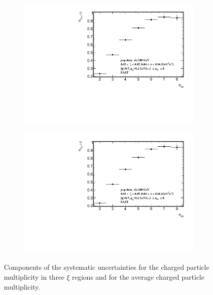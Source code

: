 \begin{figure}[h!]
\begin{subfigure}{.49\textwidth}
		\includegraphics[width=\textwidth,page=83]{chapters/chrgSTAR/img/syst/outSD.pdf}
	\end{subfigure}
	\begin{subfigure}{.49\textwidth}
		\includegraphics[width=\textwidth,page=85]{chapters/chrgSTAR/img/syst/outSD.pdf}
	\end{subfigure}
	\caption{Components of the systematic uncertainties for the charged particle multiplicity in three $\xi$ regions and for the average charged particle multiplicity. }
	\label{fig:results_star_nch_syst}
	\vspace{-1.5cm}
\end{figure}
